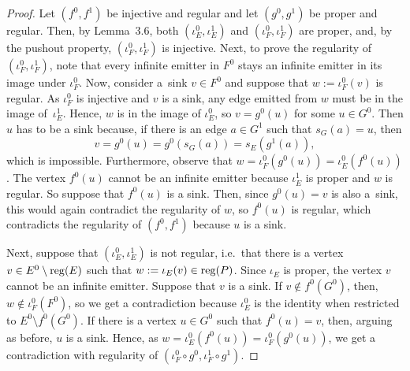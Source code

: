 \documentclass[12pt,times,a4paper]{amsart}
\numberwithin{equation}{section}
\numberwithin{equation}{section}
\begin{document}
\begin{proof}
Let $(f^0,f^1)$ be injective and regular and let $(g^0,g^1)$ be proper and regular. Then, by Lemma~3.6, both $(\iota_E^0,\iota_E^1)$ and $(\iota_F^0,\iota_F^1)$ are proper, and, by the pushout property, $(\iota_F^0,\iota_F^1)$ is injective. Next, to prove the regularity of $(\iota_F^0,\iota_F^1)$, note that every infinite emitter in $F^0$ stays an infinite emitter in its image under $\iota_F^0$. Now, consider a~sink $v\in F^0$ and suppose that 
$w:=\iota_F^0(v)$ is regular. As $\iota_F^0$ is injective and $v$ is a sink, any edge emitted from $w$ must be in the image of~$\iota_E^1$. Hence, $w$ is in the image of $\iota_E^0$, so $v=g^0(u)$ for some $u\in G^0$. Then $u$ has to be a sink because, if there is an edge $a\in G^1$ 
such that $s_G(a)=u$, then 
\begin{equation}
v=g^0(u)=g^0(s_G(a))=s_E(g^1(a)),
\end{equation}
which is impossible. 
Furthermore, observe that $w=\iota_F^0(g^0(u))=\iota_E^0(f^0(u))$. The vertex $f^0(u)$ cannot be an infinite emitter because 
$\iota^1_E$ is proper and $w$ is regular. So suppose that $f^0(u)$ is a sink. Then, since $g^0(u)=v$ is also a~sink, this would again 
contradict the regularity of $w$, so $f^0(u)$ is regular, which contradicts the regularity of 
$(f^0,f^1)$ because $u$ is a sink.

Next, suppose that $(\iota_E^0,\iota_E^1)$ is not regular, i.e.\ that there is a vertex $v\in E^0\setminus{\rm reg}(E)$ such that 
$w:=\iota_E(v)\in{\rm reg}(P)$. Since $\iota_E$ is proper, the vertex $v$ cannot be an infinite emitter. Suppose that $v$ is a sink. If 
$v\notin f^0(G^0)$, then, $w\notin\iota_F^0(F^0)$, so we get a contradiction because $\iota_E^0$ is the identity when restricted to $E^0\setminus f^0(G^0)$. If 
there is a vertex $u\in G^0$ such that $f^0(u)=v$, then, arguing as before, $u$ is  a sink. Hence, as 
$w=\iota^0_E(f^0(u))=\iota^0_F(g^0(u))$, we get a contradiction with regularity of 
$(\iota_F^0\circ g^0,\iota_F^1\circ g^1)$.


\end{proof}
\end{document}
